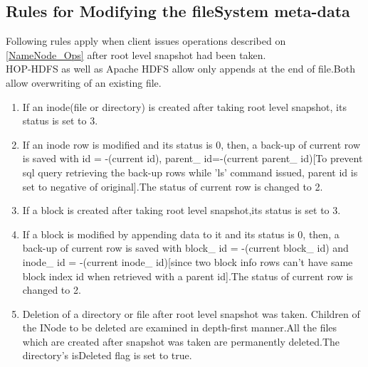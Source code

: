 \subsection{Rules for Modifying the fileSystem meta-data}
Following rules apply when client issues operations described on \ref{NameNode_Ops} after root level snapshot had been taken.\\
HOP-HDFS as well as Apache HDFS allow only appends at the end of file.Both allow overwriting of an existing file.
\begin{enumerate}
\item If an inode(file or directory) is created after taking root level snapshot, its status is set to 3.
\item If an inode row is modified and its status is 0, then, a back-up of current row is saved with id = -(current id), parent\_ id=-(current parent\_ id)[To prevent sql query retrieving the back-up rows while 'ls' command issued, parent id is set to negative of original].The status of current row is changed to 2.
\item If a block is created after taking root level snapshot,its status is set to 3.
\item If a block is modified by appending data to it and its status is 0, then, a back-up of current row is saved with block\_ id = -(current block\_ id) and inode\_ id = -(current inode\_ id)[since two block info rows can't have same block index id when retrieved with a parent id].The status of current row is changed to 2.
\item Deletion of a directory or file after root level snapshot was taken.
Children of the INode to be deleted are examined in depth-first manner.All the  files which are created after snapshot was taken are permanently deleted.The directory's isDeleted flag is set to true.
\pagebreak
%
%
%
%           

\end{enumerate}
